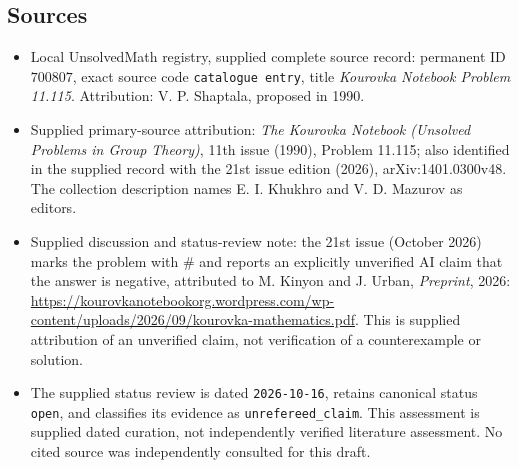 \documentclass[11pt]{article}
\begin{document}
\subsection{Sources}
\begin{itemize}
\item Local UnsolvedMath registry, supplied complete source record: permanent ID \(700807\), exact source code \texttt{catalogue entry}, title \emph{Kourovka Notebook Problem 11.115}. Attribution: V. P. Shaptala, proposed in 1990.
\item Supplied primary-source attribution: \emph{The Kourovka Notebook (Unsolved Problems in Group Theory)}, 11th issue (1990), Problem 11.115; also identified in the supplied record with the 21st issue edition (2026), arXiv:1401.0300v48. The collection description names E. I. Khukhro and V. D. Mazurov as editors.
\item Supplied discussion and status-review note: the 21st issue (October 2026) marks the problem with \(\#\) and reports an explicitly unverified AI claim that the answer is negative, attributed to M. Kinyon and J. Urban, \emph{Preprint}, 2026: \url{https://kourovkanotebookorg.wordpress.com/wp-content/uploads/2026/09/kourovka-mathematics.pdf}. This is supplied attribution of an unverified claim, not verification of a counterexample or solution.
\item The supplied status review is dated \texttt{2026-10-16}, retains canonical status \texttt{open}, and classifies its evidence as \texttt{unrefereed\_claim}. This assessment is supplied dated curation, not independently verified literature assessment. No cited source was independently consulted for this draft.
\end{itemize}
\end{document}
